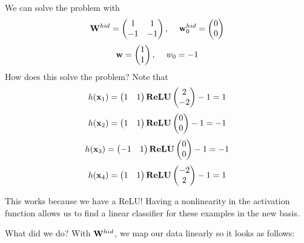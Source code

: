 \documentclass[11pt,letterpaper]{article}
\begin{document}
\begin{solution}
\begin{sol}

\noindent We can solve the problem with
\[\boldW^{hid} = \left(\begin{matrix} 1 & 1 \\ -1 & -1\end{matrix} \right), \hspace{1pc} \boldw_0^{hid} = \left( \begin{matrix} 0 \\ 0 \end{matrix} \right)\]
\[\boldw = \left(\begin{matrix} 1 \\ 1 \end{matrix} \right), \hspace{1pc} w_0 = -1\]
How does this solve the problem? Note that
\[h(\mathbf{x}_1) = \left(\begin{matrix} 1 & 1 \end{matrix} 
\right)\textbf{ReLU}\left(\begin{matrix} 2 \\ -2\end{matrix} \right) -1 = 1\]
\[h(\mathbf{x}_2) = \left(\begin{matrix} 1 & 1 \end{matrix} 
\right)\textbf{ReLU}\left(\begin{matrix} 0 \\ 0\end{matrix} \right) -1 = -1 \]
\[h(\mathbf{x}_3) = \left(\begin{matrix} -1 & 1 \end{matrix} 
\right)\textbf{ReLU}\left(\begin{matrix} 0 \\ 0\end{matrix} \right) -1 = -1\]
\[h(\mathbf{x}_4) = \left(\begin{matrix} 1 & 1 \end{matrix} 
\right)\textbf{ReLU}\left(\begin{matrix} -2 \\ 2\end{matrix} \right) -1 = 1\]

This works because we have a ReLU! Having a nonlinearity 
in the activation function allows us to
find a linear classifier for these examples in the new basis.

What did we do? With $\mathbf{W}^{hid}$, we 
map our data linearly so it looks as follows:


\end{sol}
\end{solution}
\end{document}
